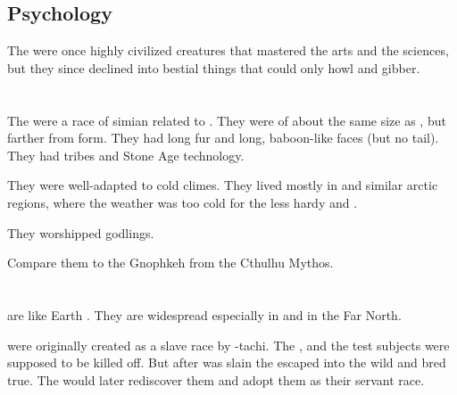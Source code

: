\subsection{Psychology}
The \glithids were once highly civilized creatures that mastered the arts and the sciences, but they since declined into bestial things that could only howl and gibber. 
















\section{\Gnomphil}
\index{\gnomphil}
The \gnomphilim were a race of simian \humanoids related to \nephilim.
They were of about the same size as \nephilim, but farther from \human form.
They had long fur and long, baboon-like faces (but no tail).
They had tribes and Stone Age technology.

They were well-adapted to cold climes.
They lived mostly in \UltimaThule and similar arctic regions, where the weather was too cold for the less hardy \humans and \scathae.

They worshipped \xss godlings. 

Compare them to the Gnophkeh from the Cthulhu Mythos. 















\section{\Human}
\Miithian{} \humans{} are like Earth \humans{}. 
They are widespread especially in \Velcad{} and in the Far North. 

\Humans{} were originally created as a slave race by \Semiza-tachi. 
The , and the test subjects were supposed to be killed off. 
But after \Thanatzil{} was slain the \humans{} escaped into the wild and bred true. 
The \resphain{} would later rediscover them and adopt them as their servant race. 









